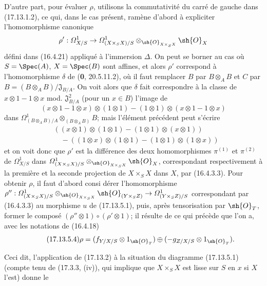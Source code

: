 \begin{env}[17.13.5]
D'autre part, pour évaluer $\rho$, utilisons la commutativité du carré de gauche dans (17.13.1.2), ce qui, dans le cas présent, ramène d'abord à expliciter l'homomorphisme canonique
\[
\rho':\varOmega^1_{X/S}\to\varOmega^1_{(X\times_SX)/S}\otimes_{\sh{O}_{X\times_SX}}\sh{O}_X
\]
défini dans (16.4.21) appliqué à l'immersion $\Delta$. On peut se borner au cas où $S=\Spec(A)$, $X=\Spec(B)$ sont affines, et alors $\rho'$ correspond à l'homomorphisme $\delta$ de (\textbf{0}, 20.5.11.2), où il faut remplacer $B$ par $B\otimes_AB$ et $C$ par $B=(B\otimes_AB)/\mathfrak J_{B/A}$. On voit alors que $\delta$ fait correspondre à la classe de $x\otimes1-1\otimes x$ mod. $\mathfrak J_{B/A}^2$ (pour un $x\in B$) l'image de
\[
(x\otimes1-1\otimes x)\otimes(1\otimes1)-(1\otimes1)\otimes(x\otimes1-1\otimes x)
\]
dans $\Omega^1_{(B\otimes_AB)/A}\otimes_{(B\otimes_AB)}B$; mais l'élément précédent peut s'écrire
\[
\begin{split}
&((x\otimes1)\otimes(1\otimes1)-(1\otimes1)\otimes(x\otimes1))\\
&\quad-((1\otimes x)\otimes(1\otimes1)-(1\otimes1)\otimes(1\otimes x))
\end{split}
\]
et on voit donc que $\rho'$ est la différence des deux homomorphismes $\pi^{(1)}$ et $\pi^{(2)}$ de $\varOmega^1_{X/S}$ dans $\varOmega^1_{(X\times_SX)/S}\otimes_{\sh{O}_{X\times_SX}}\sh{O}_X$, correspondant respectivement à la première et la seconde projection de $X\times_SX$ dans $X$, par (16.4.3.3). Pour obtenir $\rho$, il faut d'abord consi%
dérer l'homomorphisme
$\rho'':\varOmega^1_{(X\times_SX)/S}\otimes_{\sh{O}_{X\times_SX}}\sh{O}_{(Y\times_SZ)}\to\varOmega^1_{(Y\times_SZ)/S}$ correspondant par (16.4.3.3) au morphisme $u$ de (17.13.5.1), puis, après tensorisation par $\sh{O}_T$, former le composé $(\rho''\otimes1)\circ(\rho'\otimes1)$; il résulte de ce qui précède que l'on a, avec les notations de (16.4.18)
\[
\label{IV.17.13.5.4}
\tag{17.13.5.4}
\rho=(f_{Y/X/S}\otimes1_{\sh{O}_T})\oplus(-g_{Z/X/S}\otimes1_{\sh{O}_T}).
\]

Ceci dit, l'application de (17.13.2) à la situation du diagramme (17.13.5.1) (compte tenu de (17.3.3, (iv)), qui implique que $X\times_SX$ est lisse sur $S$ en $x$ si $X$ l'est) donne le
\end{env}

